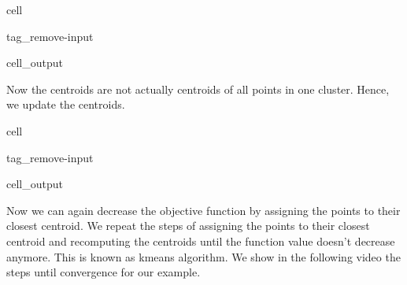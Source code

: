 \documentclass[letterpaper,10pt,english]{jupyterBook}
\begin{document}
\begin{sphinxuseclass}{cell}
\begin{sphinxuseclass}{tag_remove-input}\begin{sphinxVerbatimOutput}

\begin{sphinxuseclass}{cell_output}
\noindent{}

\end{sphinxuseclass}\end{sphinxVerbatimOutput}

\end{sphinxuseclass}
\end{sphinxuseclass}
\sphinxAtStartPar
Now the centroids are not actually centroids of all points in one cluster. Hence, we update the centroids.

\begin{sphinxuseclass}{cell}
\begin{sphinxuseclass}{tag_remove-input}\begin{sphinxVerbatimOutput}

\begin{sphinxuseclass}{cell_output}
\noindent{}

\end{sphinxuseclass}\end{sphinxVerbatimOutput}

\end{sphinxuseclass}
\end{sphinxuseclass}
\sphinxAtStartPar
Now we can again decrease the objective function by assigning the points to their closest centroid. We repeat the steps of assigning the points to their closest centroid and recomputing the centroids until the function value doesn’t decrease anymore. This is known as  k\sphinxhyphen{}means algorithm. We show in the following video the steps until convergence for our example.
\end{document}
